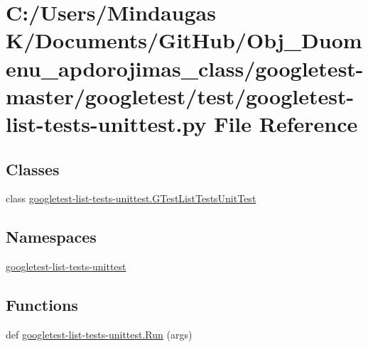 \hypertarget{googletest-master_2googletest_2test_2googletest-list-tests-unittest_8py}{}\section{C\+:/\+Users/\+Mindaugas K/\+Documents/\+Git\+Hub/\+Obj\+\_\+\+Duomenu\+\_\+apdorojimas\+\_\+class/googletest-\/master/googletest/test/googletest-\/list-\/tests-\/unittest.py File Reference}
\label{googletest-master_2googletest_2test_2googletest-list-tests-unittest_8py}
\subsection*{Classes}
\begin{DoxyCompactItemize}
\item 
class \mbox{\hyperlink{classgoogletest-list-tests-unittest_1_1_g_test_list_tests_unit_test}{googletest-\/list-\/tests-\/unittest.\+G\+Test\+List\+Tests\+Unit\+Test}}
\end{DoxyCompactItemize}
\subsection*{Namespaces}
\begin{DoxyCompactItemize}
\item 
 \mbox{\hyperlink{namespacegoogletest-list-tests-unittest}{googletest-\/list-\/tests-\/unittest}}
\end{DoxyCompactItemize}
\subsection*{Functions}
\begin{DoxyCompactItemize}
\item 
def \mbox{\hyperlink{namespacegoogletest-list-tests-unittest_a9e03b1bb25b16376b25e53a1927be5da}{googletest-\/list-\/tests-\/unittest.\+Run}} (args)
\end{DoxyCompactItemize}
